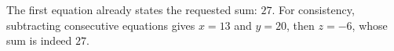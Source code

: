 The first equation already states the requested sum: $\boxed{27}$. For consistency, subtracting consecutive equations gives $x=13$ and $y=20$, then $z=-6$, whose sum is indeed $27$.
